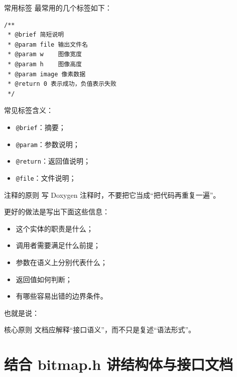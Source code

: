 \documentclass[aspectratio=169,11pt]{beamer}
\begin{document}
\begin{frame}[fragile]{常用标签}
最常用的几个标签如下：

\begin{lstlisting}
/**
 * @brief 简短说明
 * @param file 输出文件名
 * @param w    图像宽度
 * @param h    图像高度
 * @param image 像素数据
 * @return 0 表示成功，负值表示失败
 */
\end{lstlisting}

\vspace{0.5em}
常见标签含义：
\begin{itemize}
  \item \texttt{@brief}：摘要；
  \item \texttt{@param}：参数说明；
  \item \texttt{@return}：返回值说明；
  \item \texttt{@file}：文件说明；
\end{itemize}
\end{frame}

\begin{frame}{注释的原则}
写 Doxygen 注释时，不要把它当成“把代码再重复一遍”。

更好的做法是写出下面这些信息：
\begin{itemize}
  \item 这个实体的职责是什么；
  \item 调用者需要满足什么前提；
  \item 参数在语义上分别代表什么；
  \item 返回值如何判断；
  \item 有哪些容易出错的边界条件。
\end{itemize}

\vspace{0.5em}
也就是说：

\begin{block}{核心原则}
文档应解释“接口语义”，而不只是复述“语法形式”。
\end{block}
\end{frame}

\section{结合 bitmap.h 讲结构体与接口文档}
\end{document}
